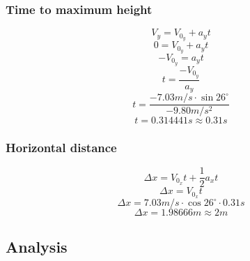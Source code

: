 \documentclass[11pt, letterpaper, includehead]{article}
\begin{document}
\subsubsection{Time to maximum height} %
$$V_y = V_{0_y} + a_yt$$
$$0 = V_{0_y} + a_yt$$
$$-V_{0_y} = a_yt$$
$$t = \frac{-V_{0_y}}{a_y}$$
$$t = \frac{-7.03m/s\cdot\sin26^{\circ}}{-9.80m/s^2}$$
$$t = 0.314441s \approx 0.31s$$
\subsubsection{Horizontal distance} %
$$\Delta x = V_{0_x}t + \frac{1}{2}a_xt$$
$$\Delta x = V_{0_x}t$$
$$\Delta x = 7.03m/s\cdot \cos26^{\circ}\cdot 0.31s$$
$$\Delta x = 1.98666m \approx 2m$$
\subsection{Analysis}  %
\end{document}
